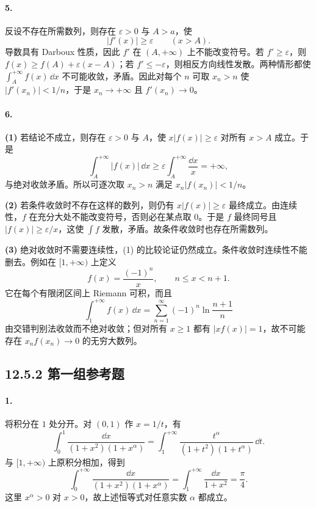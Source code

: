 \paragraph{5.}
反设不存在所需数列，则存在 $\varepsilon>0$ 与 $A>a$，使
\[
  |f'(x)|\geq\varepsilon\qquad(x>A).
\]
导数具有 Darboux 性质，因此 $f'$ 在 $(A,+\infty)$ 上不能改变符号。若 $f'\geq\varepsilon$，则
$f(x)\geq f(A)+\varepsilon(x-A)$；若 $f'\leq-\varepsilon$，则相反方向线性发散。两种情形都使 $\int_A^{+\infty}f(x)\,\dd x$ 不可能收敛，矛盾。因此对每个 $n$ 可取 $x_n>n$ 使 $|f'(x_n)|<1/n$，于是 $x_n\to+\infty$ 且 $f'(x_n)\to0$。

\paragraph{6.}
\textbf{(1)} 若结论不成立，则存在 $\varepsilon>0$ 与 $A$，使 $x|f(x)|\geq\varepsilon$ 对所有 $x>A$ 成立。于是
\[
  \int_A^{+\infty}|f(x)|\,\dd x
  \geq\varepsilon\int_A^{+\infty}\frac{\dd x}{x}=+\infty,
\]
与绝对收敛矛盾。所以可逐次取 $x_n>n$ 满足 $x_n|f(x_n)|<1/n$。

\textbf{(2)} 若条件收敛时不存在这样的数列，则仍有 $x|f(x)|\geq\varepsilon$ 最终成立。由连续性，$f$ 在充分大处不能改变符号，否则必在某点取 $0$。于是 $f$ 最终同号且 $|f(x)|\geq\varepsilon/x$，这使 $\int f$ 发散，矛盾。故条件收敛时也存在所需数列。

\textbf{(3)} 绝对收敛时不需要连续性，(1) 的比较论证仍然成立。条件收敛时连续性不能删去。例如在 $[1,+\infty)$ 上定义
\[
  f(x)=\frac{(-1)^n}{x},\qquad n\leq x<n+1.
\]
它在每个有限闭区间上 Riemann 可积，而且
\[
  \int_1^{+\infty}f(x)\,\dd x
  =\sum_{n=1}^{\infty}(-1)^n\ln\frac{n+1}{n}
\]
由交错判别法收敛而不绝对收敛；但对所有 $x\geq1$ 都有 $|xf(x)|=1$，故不可能存在 $x_nf(x_n)\to0$ 的无穷大数列。

\subsection*{12.5.2 第一组参考题}

\paragraph{1.}
将积分在 $1$ 处分开。对 $(0,1)$ 作 $x=1/t$，有
\[
  \int_0^1\frac{\dd x}{(1+x^2)(1+x^\alpha)}
  =\int_1^{+\infty}\frac{t^\alpha}{(1+t^2)(1+t^\alpha)}\,\dd t.
\]
与 $[1,+\infty)$ 上原积分相加，得到
\[
  \int_0^{+\infty}\frac{\dd x}{(1+x^2)(1+x^\alpha)}
  =\int_1^{+\infty}\frac{\dd x}{1+x^2}=\frac\pi4.
\]
这里 $x^\alpha>0$ 对 $x>0$，故上述恒等式对任意实数 $\alpha$ 都成立。

